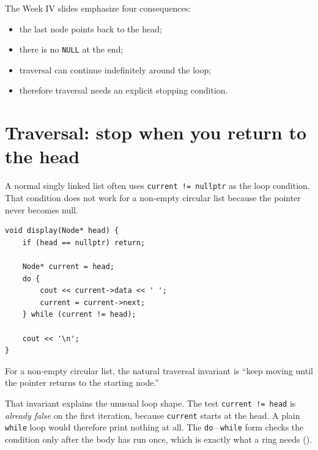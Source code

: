 The Week IV slides emphasize four consequences:

\begin{itemize}
  \item the last node points back to the head;
  \item there is no \texttt{NULL} at the end;
  \item traversal can continue indefinitely around the loop;
  \item therefore traversal needs an explicit stopping condition.
\end{itemize}

\section{Traversal: stop when you return to the head}

A normal singly linked list often uses \texttt{current != nullptr} as the loop condition. That condition does not work for a non-empty circular list because the pointer never becomes null.

\begin{lstlisting}
void display(Node* head) {
    if (head == nullptr) return;

    Node* current = head;
    do {
        cout << current->data << ' ';
        current = current->next;
    } while (current != head);

    cout << '\n';
}
\end{lstlisting}

\begin{keyidea}
For a non-empty circular list, the natural traversal invariant is ``keep moving until the pointer returns to the starting node.''
\end{keyidea}

That invariant explains the unusual loop shape. The test \texttt{current != head} is
\emph{already false} on the first iteration, because \texttt{current} starts at the head.
A plain \texttt{while} loop would therefore print nothing at all. The \texttt{do}\,--\,\texttt{while}
form checks the condition only after the body has run once, which is exactly what a ring
needs ().

